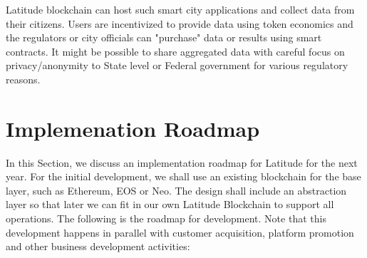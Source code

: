 Latitude blockchain can host such smart city applications and collect data from their citizens. Users are incentivized
to provide data using token economics and the regulators or city officials can "purchase" data or results using smart
contracts. It might be possible to share aggregated data with careful focus on privacy/anonymity to State level or
Federal government for various regulatory reasons. 

%

\section{Implemenation Roadmap}
\label{sec:roadmap}

In this Section, we discuss an implementation roadmap for Latitude for the next year. For the initial development, we
shall use an existing blockchain for the base layer, such as Ethereum, EOS or Neo. The design shall include an
abstraction layer so that later we can fit in our own Latitude Blockchain to support all operations. The following is
the roadmap for development. Note that this development happens in parallel with customer acquisition, platform
promotion and other business development activities:

